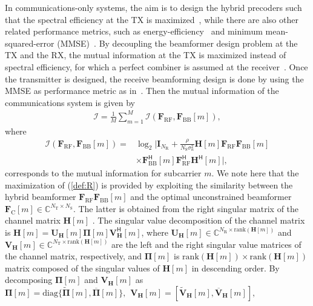 \documentclass[journal,10pt]{IEEEtran}
\begin{document}
	In communications-only systems, the aim is to design the hybrid precoders such that the spectral efficiency at the TX is maximized~\cite{elbirQuantizedCNN2019,heath2016overview,hybridBFAltMin}, while there are also other related performance metrics, such as energy-efficiency~\cite{energyEfficencyHB} and minimum mean-squared-error (MMSE)~\cite{mmseHB}. By decoupling the beamformer design problem at the TX and the RX, the mutual information at the TX is maximized instead of spectral efficiency, for which  a perfect combiner is assumed at the receiver~\cite{heath2016overview}. Once the transmitter is designed, the receive beamforming design is done by using the MMSE as performance metric as in~\cite{heath2016overview,hybridBFAltMin,elbirQuantizedCNN2019}. Then the mutual information of the communications system is given by {\color{black}
		\begin{align}
		\label{def:R}
		\mathcal{I} = \frac{1}{M}\sum_{m = 1}^{M} \mathcal{I}(\mathbf{F}_\mathrm{RF},\mathbf{F}_\mathrm{BB}[m] ),
		\end{align}
		where 
		\begin{align}
		\mathcal{I}(\mathbf{F}_\mathrm{RF},\mathbf{F}_\mathrm{BB}[m] ) = &\log_2  \bigg|\mathbf{I}_{N_\mathrm{R}} + \frac{\rho}{N_\mathrm{S}\sigma_n^2} \mathbf{H} [m] \mathbf{F}_\mathrm{RF}\mathbf{F}_\mathrm{BB}[m]   \nonumber\\
		&\times \mathbf{F}_\mathrm{BB}^\textsf{H}[m]\mathbf{F}_\mathrm{RF}^\textsf{H}\mathbf{H}^\textsf{H}[m] \bigg|,
		\end{align}
		corresponds to the mutual information for subcarrier $m$. 	We note here that the maximization of (\ref{def:R}) is provided by exploiting the similarity between the hybrid beamformer $\mathbf{F}_\mathrm{RF}\mathbf{F}_\mathrm{BB} [m]$ and the optimal unconstrained beamformer $\mathbf{F}_{\mathrm{C}} [m]\in \mathbb{C}^{N_\mathrm{T}\times N_\mathrm{S}}$. The latter is obtained from the right singular matrix of the channel matrix $\mathbf{H} [m]$ \cite{hybridBFAltMin,heath2016overview}. The singular value decomposition of the channel matrix is  $\mathbf{H} [m] = \mathbf{U}_{\mathbf{H}} [m] \boldsymbol{\Pi} [m] \mathbf{V}_{\mathbf{H}}^\textsf{H} [m]$, where $\mathbf{U}_{\mathbf{H}} [m]\in \mathbb{C}^{N_\mathrm{R}\times \mathrm{rank}(\mathbf{H} [m])}$ and $\mathbf{V}_{\mathbf{H}} [m]\in \mathbb{C}^{N_\mathrm{T} \times \mathrm{rank}(\mathbf{H} [m])}$ are the left and the right singular value matrices of the channel matrix, respectively,  and $\boldsymbol{\Pi} [m]$ is $\mathrm{rank}(\mathbf{H} [m])\times \mathrm{rank}(\mathbf{H} [m])$ matrix composed of the singular values of $\mathbf{H} [m]$ in descending order. By decomposing $\boldsymbol{\Pi} [m]$ and $\mathbf{V}_{\mathbf{H}} [m]$ as $\boldsymbol{\Pi} [m] = \mathrm{diag}\{ \widetilde{\boldsymbol{\Pi}} [m],\overline{\boldsymbol{\Pi}} [m] \},\hspace{5pt} \mathbf{V}_{\mathbf{H}} [m] = [\widetilde{\mathbf{V}}_{\mathbf{H}} [m],\overline{\mathbf{V}}_{\mathbf{H}} [m]],$
}
\end{document}
